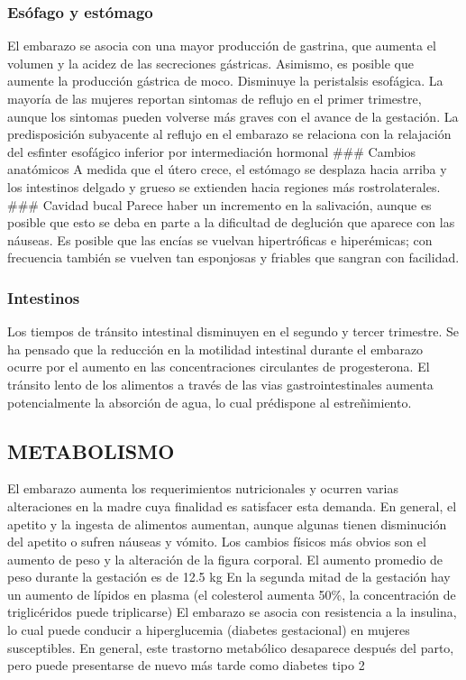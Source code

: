 \documentclass[
]{article}
\begin{document}
\hypertarget{esuxf3fago-y-estuxf3mago}{%
\subsubsection{Esófago y estómago}\label{esuxf3fago-y-estuxf3mago}}

El embarazo se asocia con una mayor producción de gastrina, que aumenta
el volumen y la acidez de las secreciones gástricas. Asimismo, es
posible que aumente la producción gástrica de moco. Disminuye la
peristalsis esofágica. La mayoría de las mujeres reportan sintomas de
reflujo en el primer trimestre, aunque los sintomas pueden volverse más
graves con el avance de la gestación. La predisposición subyacente al
reflujo en el embarazo se relaciona con la relajación del esfinter
esofágico inferior por intermediación hormonal \#\#\# Cambios anatómicos
A medida que el útero crece, el estómago se desplaza hacia arriba y los
intestinos delgado y grueso se extienden hacia regiones más
rostrolaterales. \#\#\# Cavidad bucal Parece haber un incremento en la
salivación, aunque es posible que esto se deba en parte a la dificultad
de deglución que aparece con las náuseas. Es posible que las encías se
vuelvan hipertróficas e hiperémicas; con frecuencia también se vuelven
tan esponjosas y friables que sangran con facilidad.

\hypertarget{intestinos}{%
\subsubsection{Intestinos}\label{intestinos}}

Los tiempos de tránsito intestinal disminuyen en el segundo y tercer
trimestre. Se ha pensado que la reducción en la motilidad intestinal
durante el embarazo ocurre por el aumento en las concentraciones
circulantes de progesterona. El tránsito lento de los alimentos a través
de las vias gastrointestinales aumenta potencialmente la absorción de
agua, lo cual prédispone al estreñimiento.

\hypertarget{metabolismo}{%
\subsection{METABOLISMO}\label{metabolismo}}

El embarazo aumenta los requerimientos nutricionales y ocurren varias
alteraciones en la madre cuya finalidad es satisfacer esta demanda. En
general, el apetito y la ingesta de alimentos aumentan, aunque algunas
tienen disminución del apetito o sufren náuseas y vómito. Los cambios
físicos más obvios son el aumento de peso y la alteración de la figura
corporal. El aumento promedio de peso durante la gestación es de 12.5 kg
En la segunda mitad de la gestación hay un aumento de lípidos en plasma
(el colesterol aumenta 50\%, la concentración de triglicéridos puede
triplicarse) El embarazo se asocia con resistencia a la insulina, lo
cual puede conducir a hiperglucemia (diabetes gestacional) en mujeres
susceptibles. En general, este trastorno metabólico desaparece después
del parto, pero puede presentarse de nuevo más tarde como diabetes tipo
2
\end{document}
